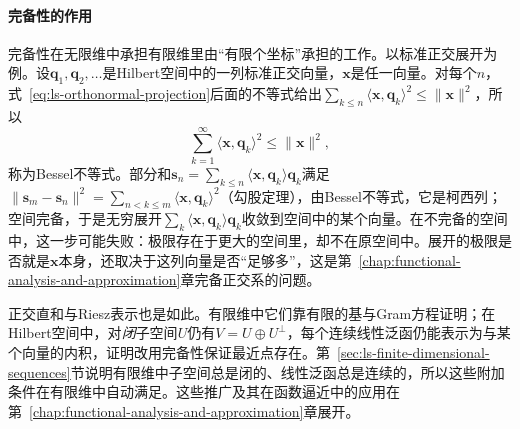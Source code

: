 \paragraph{完备性的作用}
完备性在无限维中承担有限维里由“有限个坐标”承担的工作。以标准正交展开为例。设$\bm q_1,\bm q_2,\ldots$是Hilbert空间中的一列标准正交向量，$\bm x$是任一向量。对每个$n$，式~\eqref{eq:ls-orthonormal-projection}后面的不等式给出$\sum_{k\leq n}\langle\bm x,\bm q_k\rangle^2\leq\lVert\bm x\rVert^2$，所以
\[
 \sum_{k=1}^\infty\langle\bm x,\bm q_k\rangle^2\leq\lVert\bm x\rVert^2 ,
\]
称为Bessel不等式。部分和$\bm s_n=\sum_{k\leq n}\langle\bm x,\bm q_k\rangle\bm q_k$满足$\lVert\bm s_m-\bm s_n\rVert^2=\sum_{n<k\leq m}\langle\bm x,\bm q_k\rangle^2$（勾股定理），由Bessel不等式，它是柯西列；空间完备，于是无穷展开$\sum_k\langle\bm x,\bm q_k\rangle\bm q_k$收敛到空间中的某个向量。在不完备的空间中，这一步可能失败：极限存在于更大的空间里，却不在原空间中。展开的极限是否就是$\bm x$本身，还取决于这列向量是否“足够多”，这是第~\ref{chap:functional-analysis-and-approximation}章完备正交系的问题。

正交直和与Riesz表示也是如此。有限维中它们靠有限的基与Gram方程证明；在Hilbert空间中，对\emph{闭}子空间$U$仍有$V=U\oplus U^\perp$，每个连续线性泛函仍能表示为与某个向量的内积，证明改用完备性保证最近点存在。第~\ref{sec:ls-finite-dimensional-sequences}节说明有限维中子空间总是闭的、线性泛函总是连续的，所以这些附加条件在有限维中自动满足。这些推广及其在函数逼近中的应用在第~\ref{chap:functional-analysis-and-approximation}章展开。
